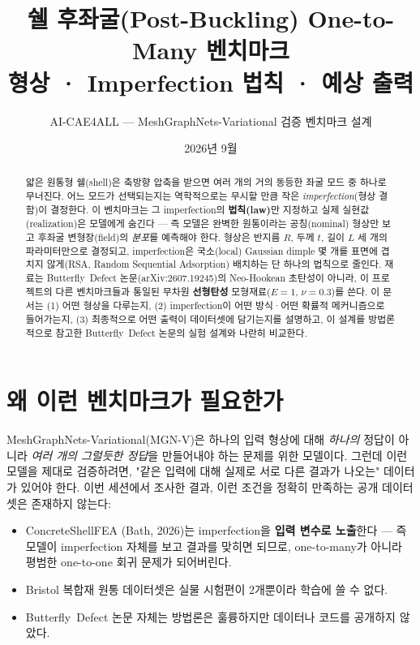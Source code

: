 \documentclass[11pt]{article}
\title{\textbf{쉘 후좌굴(Post-Buckling) One-to-Many 벤치마크\\
형상 · Imperfection 법칙 · 예상 출력}}
\author{AI-CAE4ALL --- MeshGraphNets-Variational 검증 벤치마크 설계}
\date{2026년 9월}
\begin{document}
\maketitle

\begin{abstract}
\noindent
얇은 원통형 쉘(shell)은 축방향 압축을 받으면 여러 개의 거의 동등한 좌굴 모드 중
하나로 무너진다. 어느 모드가 선택되는지는 역학적으로는 무시할 만큼 작은
\emph{imperfection}(형상 결함)이 결정한다. 이 벤치마크는 그 imperfection의
\textbf{법칙(law)}만 지정하고 실제 실현값(realization)은 모델에게 숨긴다 --- 즉
모델은 완벽한 원통이라는 공칭(nominal) 형상만 보고 후좌굴 변형장(field)의
\emph{분포}를 예측해야 한다. 형상은 반지름 $R$, 두께 $t$, 길이 $L$ 세 개의
파라미터만으로 결정되고, imperfection은 국소(local) Gaussian dimple 몇 개를
표면에 겹치지 않게(RSA, Random Sequential Adsorption) 배치하는 단 하나의 법칙으로
줄인다. 재료는 Butterfly~Defect 논문(arXiv:2607.19245)의 Neo-Hookean 초탄성이
아니라, 이 프로젝트의 다른 벤치마크들과 통일된 무차원 \textbf{선형탄성}
모형재료($E{=}1$, $\nu{=}0.3$)를 쓴다. 이 문서는
(1) 어떤 형상을 다루는지, (2) imperfection이 어떤
방식·어떤 확률적 메커니즘으로 들어가는지, (3) 최종적으로 어떤 출력이
데이터셋에 담기는지를 설명하고, 이 설계를 방법론적으로 참고한
Butterfly~Defect 논문의 실험 설계와 나란히 비교한다.
\end{abstract}

\tableofcontents

\section{왜 이런 벤치마크가 필요한가}

MeshGraphNets-Variational(MGN-V)은 하나의 입력 형상에 대해 \emph{하나의}
정답이 아니라 \emph{여러 개의 그럴듯한 정답}을 만들어내야 하는 문제를 위한
모델이다. 그런데 이런 모델을 제대로 검증하려면, "같은 입력에 대해 실제로
서로 다른 결과가 나오는" 데이터가 있어야 한다. 이번 세션에서 조사한
결과, 이런 조건을 정확히 만족하는 공개 데이터셋은 존재하지 않는다:

\begin{itemize}
\item ConcreteShellFEA (Bath, 2026)는 imperfection을 \textbf{입력 변수로 노출}한다 ---
      즉 모델이 imperfection 자체를 보고 결과를 맞히면 되므로, one-to-many가 아니라
      평범한 one-to-one 회귀 문제가 되어버린다.
\item Bristol 복합재 원통 데이터셋은 실물 시험편이 2개뿐이라 학습에 쓸 수 없다.
\item Butterfly~Defect 논문 자체는 방법론은 훌륭하지만 데이터나 코드를 공개하지 않았다.
\end{itemize}
\end{document}
